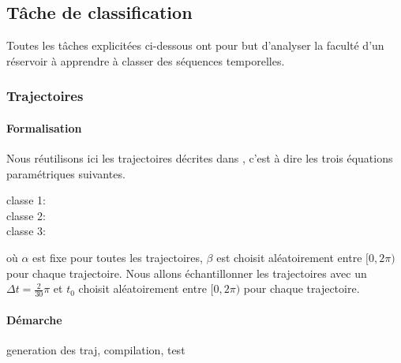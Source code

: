 \documentclass[12pt]{article}
\begin{document}
\subsection{Tâche de classification}

Toutes les tâches explicitées ci-dessous ont pour but d'analyser la faculté d'un réservoir à apprendre à classer des séquences temporelles.

\subsubsection{Trajectoires}
\paragraph{Formalisation}
Nous réutilisons ici les trajectoires décrites dans \cite{HuskenStagge}, c'est à dire les trois équations paramétriques suivantes.
\begin{description}
\item[classe 1:]
\item[classe 2:] 
\item[classe 3:] 
\end{description}
où $\alpha$ est fixe pour toutes les trajectoires, $\beta$ est choisit aléatoirement entre $[0, 2\pi)$ pour chaque trajectoire. Nous allons échantillonner les trajectoires avec un $\Delta t = \frac{2}{30}\pi$ et $t_0$ choisit aléatoirement entre $[0, 2\pi)$ pour chaque trajectoire.

\paragraph{Démarche}
generation des traj, compilation, test
\end{document}
